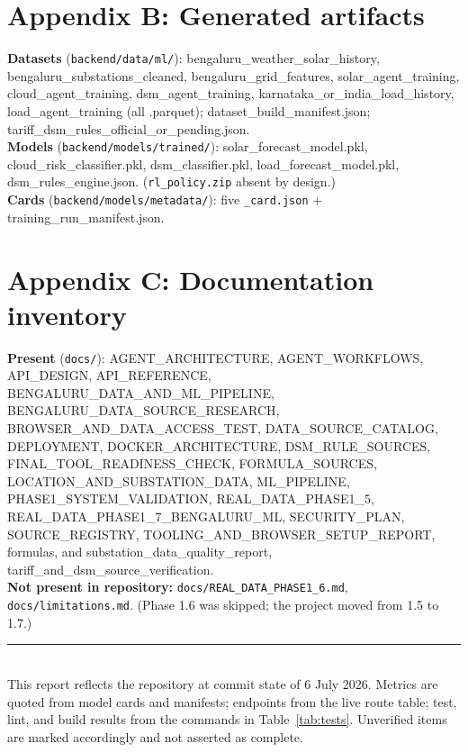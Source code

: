 \documentclass[11pt,a4paper]{article}
\newcommand{\code}[1]{\texttt{\small #1}}
\begin{document}
\section*{Appendix B: Generated artifacts}
\textbf{Datasets} (\code{backend/data/ml/}): bengaluru\_weather\_solar\_history,
bengaluru\_substations\_cleaned, bengaluru\_grid\_features, solar\_agent\_training,
cloud\_agent\_training, dsm\_agent\_training, karnataka\_or\_india\_load\_history,
load\_agent\_training (all .parquet); dataset\_build\_manifest.json;
tariff\_dsm\_rules\_official\_or\_pending.json.\\
\textbf{Models} (\code{backend/models/trained/}): solar\_forecast\_model.pkl,
cloud\_risk\_classifier.pkl, dsm\_classifier.pkl, load\_forecast\_model.pkl,
dsm\_rules\_engine.json. (\code{rl\_policy.zip} absent by design.)\\
\textbf{Cards} (\code{backend/models/metadata/}): five \code{*\_card.json} +
training\_run\_manifest.json.

\section*{Appendix C: Documentation inventory}
\label{sec:docs}
\textbf{Present} (\code{docs/}): AGENT\_ARCHITECTURE, AGENT\_WORKFLOWS, API\_DESIGN,
API\_REFERENCE, BENGALURU\_DATA\_AND\_ML\_PIPELINE, BENGALURU\_DATA\_SOURCE\_RESEARCH,
BROWSER\_AND\_DATA\_ACCESS\_TEST, DATA\_SOURCE\_CATALOG, DEPLOYMENT, DOCKER\_ARCHITECTURE,
DSM\_RULE\_SOURCES, FINAL\_TOOL\_READINESS\_CHECK, FORMULA\_SOURCES,
LOCATION\_AND\_SUBSTATION\_DATA, ML\_PIPELINE, PHASE1\_SYSTEM\_VALIDATION,
REAL\_DATA\_PHASE1\_5, REAL\_DATA\_PHASE1\_7\_BENGALURU\_ML, SECURITY\_PLAN,
SOURCE\_REGISTRY, TOOLING\_AND\_BROWSER\_SETUP\_REPORT, formulas, and
substation\_data\_quality\_report, tariff\_and\_dsm\_source\_verification.\\
\textbf{Not present in repository:} \code{docs/REAL\_DATA\_PHASE1\_6.md},
\code{docs/limitations.md}. (Phase 1.6 was skipped; the project moved from 1.5 to 1.7.)

\vspace{1em}
\noindent\rule{\linewidth}{0.4pt}\\
{\footnotesize This report reflects the repository at commit state of 6 July 2026. Metrics
are quoted from model cards and manifests; endpoints from the live route table; test,
lint, and build results from the commands in Table~\ref{tab:tests}. Unverified items are
marked accordingly and not asserted as complete.}

\nocite{*}


\end{document}
